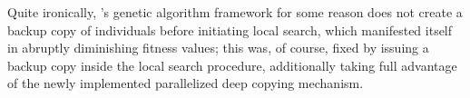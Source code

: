 Quite ironically, \evosuite's genetic algorithm framework for some reason does not create a backup 
copy of individuals before initiating local search, which manifested itself in abruptly diminishing 
fitness values; this was, of course, fixed by issuing a backup copy inside the local search procedure, 
additionally taking full advantage of the newly implemented parallelized deep copying mechanism.
